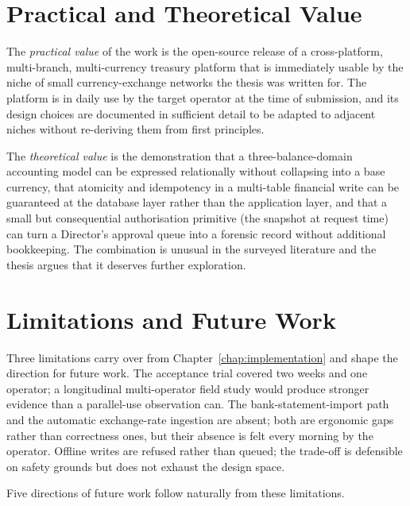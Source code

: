 \section*{Practical and Theoretical Value}
The \emph{practical value} of the work is the open-source release of a cross-platform, multi-branch, multi-currency treasury platform that is immediately usable by the niche of small currency-exchange networks the thesis was written for. The platform is in daily use by the target operator at the time of submission, and its design choices are documented in sufficient detail to be adapted to adjacent niches without re-deriving them from first principles.

The \emph{theoretical value} is the demonstration that a three-balance-domain accounting model can be expressed relationally without collapsing into a base currency, that atomicity and idempotency in a multi-table financial write can be guaranteed at the database layer rather than the application layer, and that a small but consequential authorisation primitive (the snapshot at request time) can turn a Director's approval queue into a forensic record without additional bookkeeping. The combination is unusual in the surveyed literature and the thesis argues that it deserves further exploration.

\section*{Limitations and Future Work}
Three limitations carry over from Chapter~\ref{chap:implementation} and shape the direction for future work. The acceptance trial covered two weeks and one operator; a longitudinal multi-operator field study would produce stronger evidence than a parallel-use observation can. The bank-statement-import path and the automatic exchange-rate ingestion are absent; both are ergonomic gaps rather than correctness ones, but their absence is felt every morning by the operator. Offline writes are refused rather than queued; the trade-off is defensible on safety grounds but does not exhaust the design space.

Five directions of future work follow naturally from these limitations.

